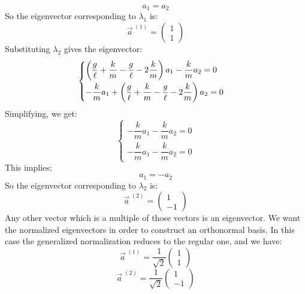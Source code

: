 \begin{equation}
    a_1 = a_2
\end{equation}
So the eigenvector corresponding to $\lambda_1$ is:
\begin{equation}
    \vec{a}^{\;(1)} = \begin{pmatrix}
        1\\
        1
    \end{pmatrix}
\end{equation}
Substituting $\lambda_2$ gives the eigenvector:
\begin{equation}
    \begin{cases}
        \left(\dfrac{g}{\ell} + \dfrac{k}{m} - \dfrac{g}{\ell} - 2\dfrac{k}{m}\right) a_1 - \dfrac{k}{m} a_2 = 0\\[8pt]
        -\dfrac{k}{m} a_1 + \left(\dfrac{g}{\ell} + \dfrac{k}{m} - \dfrac{g}{\ell} - 2\dfrac{k}{m}\right) a_2 = 0
    \end{cases}
\end{equation}
Simplifying, we get:
\begin{equation}
    \begin{cases}
        -\dfrac{k}{m} a_1 - \dfrac{k}{m} a_2 = 0\\[8pt]
        -\dfrac{k}{m} a_1 - \dfrac{k}{m} a_2 = 0
    \end{cases}
\end{equation}
This implies:
\begin{equation}
    a_1 = -a_2
\end{equation}
So the eigenvector corresponding to $\lambda_2$ is:
\begin{equation}
    \vec{a}^{\;(2)} = \begin{pmatrix}
        1\\[8pt]
        -1
    \end{pmatrix}
\end{equation}
Any other vector which is a multiple of those vectors is an eigenvector. We want the normalized eigenvectors in order to construct an orthonormal basis. In this case the generalized normalization reduces to the regular one, and we have:
\begin{equation}
    \vec{a}^{\;(1)} = \dfrac{1}{\sqrt{2}}\begin{pmatrix}
        1\\[8pt]
        1
    \end{pmatrix}
\end{equation}
\begin{equation}
    \vec{a}^{\;(2)} = \dfrac{1}{\sqrt{2}}\begin{pmatrix}
        1\\[8pt]
        -1
    \end{pmatrix}
\end{equation}
